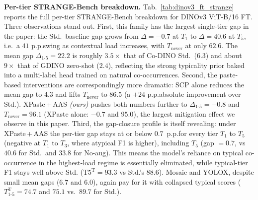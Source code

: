 \begin{table}[!htp]%
\centering
\footnotesize
\setlength{\tabcolsep}{4pt}
\caption{\textbf{DINOv3 ViT-B/16 fine-tuned: in-domain (COCO) and
cross-domain (Objects365) typicality.} On COCO, XPaste\,+\,AAS \emph{(ours)} has the highest F1$^{\text{val}}$, typical and atypical F1. Ranked by Objects365's own NPMI (right block), Objects365 shows a gap of $7.1$ to $8.0$~p.p.\@ for every row except Mosaic and YOLOX, whose arms collapse, and SCP and SCP\,+\,AAS \emph{(ours)} have the highest typical and atypical F1, raising the atypical arm more than the typical one over Std. Ranked by COCO NPMI (middle block), every Objects365 gap is $1.7$ to $1.8$ times larger. F1$_{\text{micro}}$ (\%) on the quintile paired splits of COCO val and Objects365 val, the latter split by COCO \texttt{train2017} NPMI or by NPMI recomputed on Objects365 train (App.~\ref{app:exp-datasets}); rows as in Tab.~\ref{tab:dinov3_main} without the linear probe. Best per column in \textbf{bold}, second-best \underline{underlined}.}
\label{tab:dinov3_ft_cd}

\end{table}

\noindent\textbf{Per-tier STRANGE-Bench breakdown.} Tab.~\ref{tab:dinov3_ft_strange} reports the full per-tier STRANGE-Bench breakdown for DINOv3 ViT-B/16 FT. Three observations stand out. First, this family has the largest single-tier gap in the paper: the Std.\ baseline gap grows from $\Delta = -0.7$ at $T_1$ to $\Delta = {}$$40.6$ at $T_5$, i.e.\ a $41$ p.p.\@ swing as contextual load increases, with $T_{\text{never}}$ at only $62.6$. The mean gap $\Delta_{1\text{-}5} = {}$$22.2$ is roughly $3.5\times$ that of Co-DINO Std.\ ($6.3$) and about $9\times$ that of GDINO zero-shot ($2.4$), reflecting the strong typicality prior baked into a multi-label head trained on natural co-occurrences. Second, the paste-based interventions are correspondingly more dramatic: SCP alone reduces the mean gap to $4.3$ and lifts $T_{\text{never}}$ to $86.5$ (a $+24$ p.p.\@ absolute improvement over Std.). XPaste\,+\,AAS \emph{(ours)} pushes both numbers further to $\Delta_{1\text{-}5} = {}$$-0.8$ and $T_{\text{never}} = {}$$96.1$ (XPaste alone: $-0.7$ and $95.0$), the largest mitigation effect we observe in this paper. Third, the gap-closure profile is itself revealing: under XPaste\,+\,AAS the per-tier gap stays at or below $0.7$~p.p.\@ for every tier $T_1$ to $T_5$ (negative at $T_1$ to $T_3$, where atypical F1 is higher), including $T_5$ (gap $= {}$$0.7$, vs $40.6$ for Std.\ and $33.8$ for No-aug). This means the model's reliance on typical co-occurrence in the highest-load regime is essentially eliminated, while typical-tier F1 stays well above Std. ($\text{T}5^{\text{T}} = {}$$93.3$ vs Std.'s $88.6$). Mosaic and YOLOX, despite small mean gaps ($6.7$ and $6.0$), again pay for it with collapsed typical scores ($T^{\text{T}}_{1\text{-}5} = 74.7$ and $75.1$ vs.\ $89.7$ for Std.).


